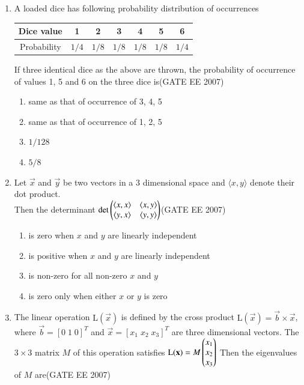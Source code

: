 \documentclass[a4paper,10pt]{exam}
\theoremstyle{remark}
\begin{document}
\begin{enumerate}
\item  \quad A loaded dice has following probability distribution of occurrences

\begin{center}
\begin{tabular}{|c|c|c|c|c|c|c|}
\hline
Dice value      & 1   & 2   & 3   & 4   & 5   & 6   \\
\hline
Probability     & $1/4$ & $1/8$ & $1/8$ & $1/8$ & $1/8$ & $1/4$ \\
\hline
\end{tabular}
\end{center}

If three identical dice as the above are thrown, the probability of occurrence of values 1, 5 and 6 on the three dice is\hfill{(GATE EE 2007)} 
 
\begin{enumerate}
    \item same as that of occurrence of 3, 4, 5
    \item same as that of occurrence of 1, 2, 5
    \item$1/128$
    \item $5/8$
\end{enumerate}


\item  \quad Let $\vec{x}$ and $\vec{y}$ be two vectors in a 3 dimensional space and $\langle x, y \rangle$ denote their dot product.\\
Then the determinant
$
\det\begin{pmatrix}
\langle x, x \rangle & \langle x, y \rangle \\
\langle y, x \rangle & \langle y, y \rangle 
\end{pmatrix}
$\hfill{(GATE EE 2007)} 
\noindent
\begin{enumerate}
\item is zero when $x$ and $y$ are linearly independent
\item is positive when $x$ and $y$ are linearly independent
\item is non-zero for all non-zero $x$ and $y$
\item is zero only when either $x$ or $y$ is zero
\end{enumerate}

\item  \quad The linear operation $\mathrm{L}(\vec{x})$ is defined by the cross product $\mathrm{L}(\vec{x}) = \vec{b} \times \vec{x}$, where $\vec{b} = [0\;1\;0]^T$ and $\vec{x} = [x_1\;x_2\;x_3]^T$ are three dimensional vectors. The $3 \times 3$ matrix $M$ of this operation satisfies
$
    \mathrm{L}(\mathbf{x}) = M \begin{pmatrix}
        x_1 \\
        x_2 \\
        x_3
    \end{pmatrix}
$
Then the eigenvalues of $M$ are\hfill{(GATE EE 2007)} 


\end{enumerate}
\end{document}
